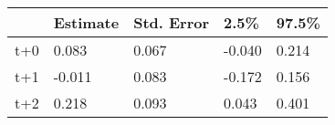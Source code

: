 \begin{tabular}{lllll}
  \toprule
  & Estimate & Std. Error & 2.5\% & 97.5\% \\ 
  \midrule
t+0 & 0.083 & 0.067 & -0.040 & 0.214 \\ 
  t+1 & -0.011 & 0.083 & -0.172 & 0.156 \\ 
  t+2 & 0.218 & 0.093 & 0.043 & 0.401 \\ 
   \bottomrule
\end{tabular}
